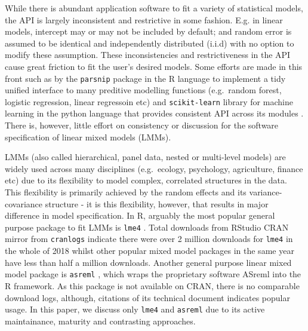 \documentclass[runningheads]{llncs}
\begin{document}
While there is abundant application software to fit a variety of statistical models, the API is largely inconsistent and restrictive in some fashion. E.g. in linear models, intercept may or may not be included by default; and random error is assumed to be identical and independently distributed (i.i.d) with no option to modify these assumption. These inconsistencies and restrictiveness in the API cause great friction to fit the user's desired models. Some efforts are made in this front such as by the \texttt{parsnip} package \autocite{Kuhn2018} in the R language \autocite{R2018} to implement a tidy unified interface to many preditive modelling functions (e.g.~random forest, logistic regression, linear regressoin etc) and \texttt{scikit-learn} library \autocite{scikit-learn} for machine learning in the python language \autocite{van1995python} that provides consistent API across its modules \autocite{sklearn_api}. There is, however, little effort on consistency or discussion for the software specification of linear mixed models (LMMs).

LMMs (also called hierarchical, panel data, nested or multi-level models) are widely used across many disciplines (e.g.~ecology, psychology, agriculture, finance etc) due to its flexibility to model complex, correlated structures in the data. This flexibility is primarily achieved by the random effects and its variance-covariance structure - it is this flexibility, however, that results in major difference in model specification. In R, arguably the most popular general purpose package to fit LMMs is \texttt{lme4} \autocite{Bates2015}. Total downloads from RStudio CRAN mirror from \texttt{cranlogs} \autocite{cranlog} indicate there were over 2 million downloads for \texttt{lme4} in the whole of 2018 whilst other popular mixed model packages \autocites[e.g. \texttt{nlme},][]{nlme}[\texttt{rstan},][]{rstan}[\texttt{brms},][]{brmsjss}{brmsr} in the same year have less than half a million downloads. Another general purpose linear mixed model package is \texttt{asreml} \autocite{Butler2009}, which wraps the proprietary software ASreml \autocite{Gilmour2009} into the R framework. As this package is not available on CRAN, there is no comparable download logs, although, citations of its technical document indicates popular usage. In this paper, we discuss only \texttt{lme4} and \texttt{asreml} due to its active maintainance, maturity and contrasting approaches.
\end{document}

